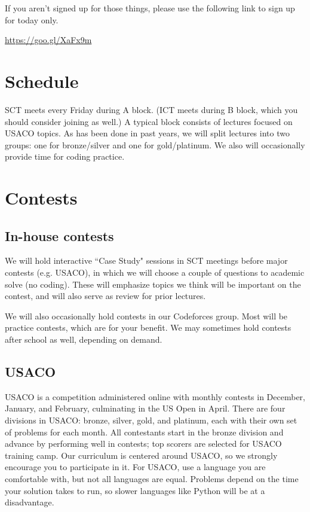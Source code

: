 \documentclass{article}
\begin{document}
If you aren't signed up for those things, please use the following link to sign up for today only.

\begin{center}
\Large{\url{https://goo.gl/XaFx9m}}
\end{center}


\section{Schedule}

SCT meets every Friday during A block. (ICT meets during B block, which you should consider joining as well.) A typical block consists of lectures focused on USACO topics. As has been done in past years, we will split lectures into two groups: one for bronze/silver and one for gold/platinum. We also will occasionally provide time for coding practice.\newpage



\section{Contests}

\subsection{In-house contests}

We will hold interactive ``Case Study" sessions in SCT meetings before major contests (e.g. USACO), in which we will choose a couple of questions to academic solve (no coding). These will emphasize topics we think will be important on the contest, and will also serve as review for prior lectures.

We will also occasionally hold contests in our Codeforces group. Most will be practice contests, which are for your benefit. We may sometimes hold contests after school as well, depending on demand.

\subsection{USACO}

USACO is a competition administered online with monthly contests in December, January, and February, culminating in the US Open in April. There are four divisions in USACO: bronze, silver, gold, and platinum, each with their own set of problems for each month. All contestants start in the bronze division and advance by performing well in contests; top scorers are selected for USACO training camp. Our curriculum is centered around USACO, so we strongly encourage you to participate in it.  For USACO, use a language you are comfortable with, but not all languages are equal.  Problems depend on the time your solution takes to run, so slower languages like Python will be at a disadvantage.\newline
\end{document}
